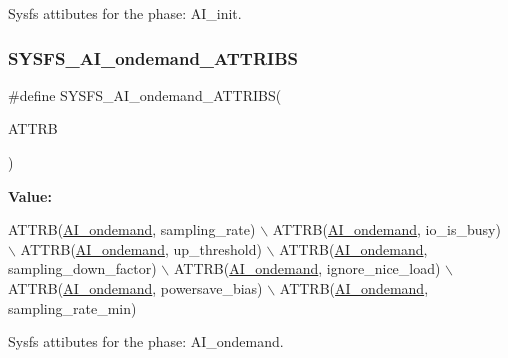 Sysfs attibutes for the phase\+: A\+I\+\_\+init. 

\mbox{\label{group__sysfs__attrb__init_gac46c6acb492c013e3a484aca4b53f5ab}} 
\subsubsection{\texorpdfstring{S\+Y\+S\+F\+S\+\_\+\+A\+I\+\_\+ondemand\+\_\+\+A\+T\+T\+R\+I\+BS}{SYSFS\_AI\_ondemand\_ATTRIBS}}
{\footnotesize\ttfamily \#define S\+Y\+S\+F\+S\+\_\+\+A\+I\+\_\+ondemand\+\_\+\+A\+T\+T\+R\+I\+BS(\begin{DoxyParamCaption}\item[{}]{A\+T\+T\+RB }\end{DoxyParamCaption})}

{\bfseries Value\+:}
\begin{DoxyCode}
ATTRB(\hyperlink{AI__gov__phases_8h_a59664fef4d2987410ea13b917756d6aca8475905133d1f00064641492c1fd7f67}{AI\_ondemand}, sampling\_rate) \(\backslash\)
            ATTRB(\hyperlink{AI__gov__phases_8h_a59664fef4d2987410ea13b917756d6aca8475905133d1f00064641492c1fd7f67}{AI\_ondemand}, io\_is\_busy) \(\backslash\)
            ATTRB(\hyperlink{AI__gov__phases_8h_a59664fef4d2987410ea13b917756d6aca8475905133d1f00064641492c1fd7f67}{AI\_ondemand}, up\_threshold) \(\backslash\)
            ATTRB(\hyperlink{AI__gov__phases_8h_a59664fef4d2987410ea13b917756d6aca8475905133d1f00064641492c1fd7f67}{AI\_ondemand}, sampling\_down\_factor) \(\backslash\)
            ATTRB(\hyperlink{AI__gov__phases_8h_a59664fef4d2987410ea13b917756d6aca8475905133d1f00064641492c1fd7f67}{AI\_ondemand}, ignore\_nice\_load) \(\backslash\)
            ATTRB(\hyperlink{AI__gov__phases_8h_a59664fef4d2987410ea13b917756d6aca8475905133d1f00064641492c1fd7f67}{AI\_ondemand}, powersave\_bias) \(\backslash\)
            ATTRB(\hyperlink{AI__gov__phases_8h_a59664fef4d2987410ea13b917756d6aca8475905133d1f00064641492c1fd7f67}{AI\_ondemand}, sampling\_rate\_min)
\end{DoxyCode}


Sysfs attibutes for the phase\+: A\+I\+\_\+ondemand. 

